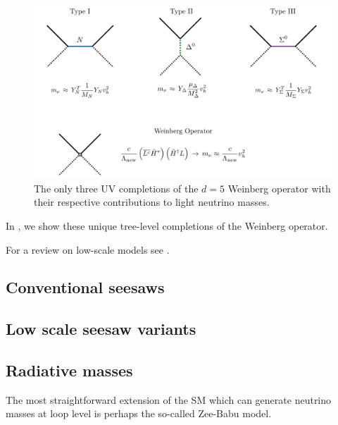\begin{figure}[t]
\centering
\includegraphics[width=\textwidth]{seesaw_mechanisms.pdf}
\caption{The only three UV completions of the $d=5$ Weinberg operator with their respective contributions to light neutrino masses.\label{fig:seesaw_mechanisms}}
\end{figure}


In , we show these unique tree-level completions of the Weinberg operator.

For a review on low-scale models see \cite{Boucenna:2014zba}.

\subsection{Conventional seesaws}

\subsection{Low scale seesaw variants}

\subsection{Radiative masses}

The most straightforward extension of the SM which can generate neutrino masses at loop level is perhaps the so-called Zee-Babu model.